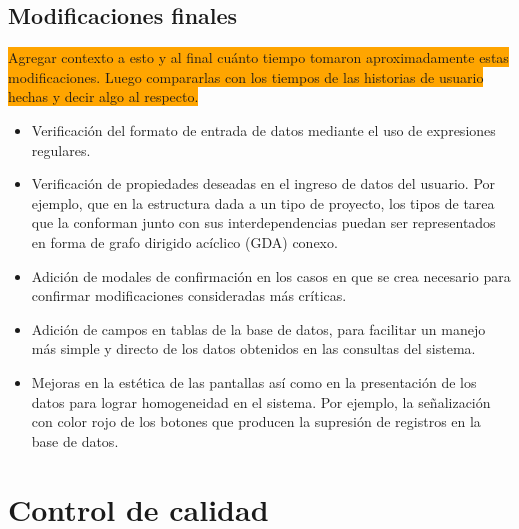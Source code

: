 \documentclass[a4paper, 12pt,twoside]{report}  %
\numberwithin{equation}{subsection} %
\begin{document}
\section{Modificaciones finales}
\colorbox{orange}{Agregar contexto a esto y al final cuánto tiempo tomaron aproximadamente estas modificaciones. Luego compararlas con los tiempos de las historias de usuario hechas y decir algo al respecto.}
\begin{itemize}
	\item Verificación del formato de entrada de datos mediante el uso de expresiones regulares.
	\item Verificación de propiedades deseadas en el ingreso de datos del usuario. Por ejemplo, que en la estructura dada a un tipo de proyecto, los tipos de tarea que la conforman junto con sus interdependencias puedan ser representados en forma de grafo dirigido acíclico (GDA) conexo.
	\item Adición de modales de confirmación en los casos en que se crea necesario para confirmar modificaciones consideradas más críticas.
	\item Adición de campos en tablas de la base de datos, para facilitar un manejo más simple y directo de los datos obtenidos en las consultas del sistema.
	\item Mejoras en la estética de las pantallas así como en la presentación de los datos para lograr homogeneidad en el sistema. Por ejemplo, la señalización con color rojo de los botones que producen la supresión de registros en la base de datos.
\end{itemize}

\chapter{Control de calidad}
\end{document}
